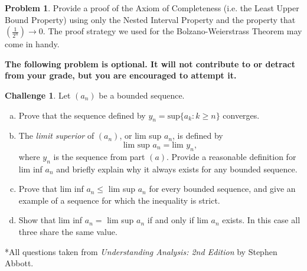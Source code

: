 \documentclass{amsart}
\newcommand{\+}[1]{\ensuremath{\mathbf{#1}}}
\theoremstyle{definition}
\newtheorem{prob}{Problem}
\newtheorem{chal}{Challenge}
\begin{document}
\begin{prob}
Provide a proof of the Axiom of Completeness (i.e. the Least Upper Bound Property) using only
the Nested Interval Property and the property that $(\frac{1}{2^n}) \to 0$.  The proof strategy
we used for the Bolzano-Weierstrass Theorem may come in handy.
\end{prob}




\vspace{5mm}

{\bf The following problem is optional.  It
will not contribute to or detract from your grade, but you are encouraged
to attempt it.}

\vspace{5mm}

\begin{chal}
Let $(a_n)$ be a bounded sequence.
\begin{enumerate}[(a)]
 \item Prove that the sequence defined by $y_n = \text{sup}\{a_k:k \geq n\}$ converges.
 \item The \emph{limit superior} of $(a_n)$, or lim sup $a_n$, is defined by 
 \[
 \text{lim sup } a_n = \text{lim } y_n,
 \]
 where $y_n$ is the sequence from part $(a)$.  Provide a reasonable definition for
 lim inf $a_n$ and briefly explain why it always exists for any bounded sequence.
 \item Prove that lim inf $a_n \leq $ lim sup $a_n$ for every bounded sequence, and give
 an example of a sequence for which the inequality is strict.
 \item Show that lim inf $a_n = $ lim sup $a_n$ if and only if lim $a_n$ exists.
 In this case all three share the same value.
\end{enumerate}
\end{chal}




\vspace{5mm}

*All questions taken from \emph{Understanding Analysis: 2nd Edition} by Stephen Abbott.
\end{document}
